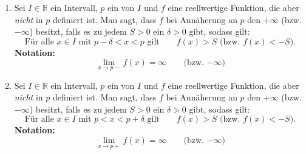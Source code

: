 \begin{enumerate}
    \item Sei $I \in \mathbb{R}$ ein Intervall, $p$ ein  von $I$ und $f$ eine reellwertige Funktion, die aber \textit{nicht} in $p$ definiert ist. Man sagt, dass $f$ bei Annäherung an $p$ den  $+\infty$ (bzw. $-\infty$) besitzt, falls es zu jedem $S > 0$ ein $\delta > 0$ gibt, sodass gilt:
    $$\text{Für alle $x \in I$ mit $p - \delta  < x < p$ gilt} \qquad f(x) > S \text{ (bzw. $f(x) < -S$).}$$
    \textbf{Notation:} $$\lim_{x \to p-} f(x) = \infty \qquad \text{(bzw. $-\infty$)}$$
    \item Sei $I \in \mathbb{R}$ ein Intervall, $p$ ein  von $I$ und $f$ eine reellwertige Funktion, die aber \textit{nicht} in $p$ definiert ist. Man sagt, dass $f$ bei Annäherung an $p$ den  $+\infty$ (bzw. $-\infty$) besitzt, falls es zu jedem $S > 0$ ein $\delta > 0$ gibt, sodass gilt:
    $$\text{Für alle $x \in I$ mit $p < x < p + \delta$ gilt} \qquad f(x) > S \text{ (bzw. $f(x) < -S$).}$$
    \textbf{Notation:} $$\lim_{x \to p+} f(x) = \infty \qquad \text{(bzw. $-\infty$)}$$
\end{enumerate}